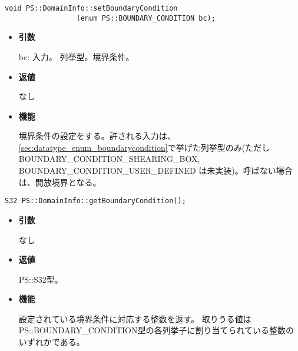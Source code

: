 
\begin{screen}
\begin{verbatim}
void PS::DomainInfo::setBoundaryCondition
                 (enum PS::BOUNDARY_CONDITION bc);
\end{verbatim}
\end{screen}

\begin{itemize}

\item {\bf 引数}

bc: 入力。 列挙型。境界条件。

\item {\bf 返値}

なし

\item {\bf 機能}

境界条件の設定をする。許される入力は、
\ref{sec:datatype_enum_boundarycondition}で挙げた列挙型のみ(ただし
BOUNDARY\_CONDITION\_SHEARING\_BOX, BOUNDARY\_CONDITION\_USER\_DEFINED
は未実装)。呼ばない場合は、開放境界となる。

\end{itemize}


\begin{screen}
\begin{verbatim}
S32 PS::DomainInfo::getBoundaryCondition();
\end{verbatim}
\end{screen}

\begin{itemize}

\item {\bf 引数}

なし

\item {\bf 返値}

PS::S32型。

\item {\bf 機能}

設定されている境界条件に対応する整数を返す。
取りうる値はPS::BOUNDARY\_CONDITION型の各列挙子に割り当てられている整数のいずれかである。

\end{itemize}


